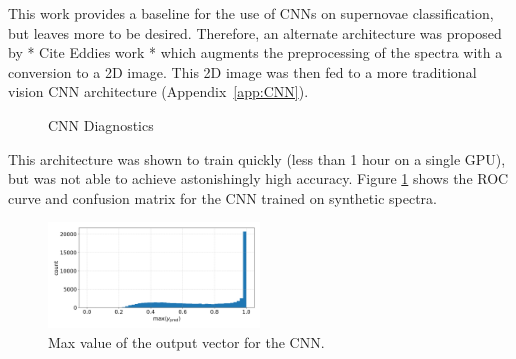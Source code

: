 This work provides a baseline for the use of CNNs on supernovae classification, 
but leaves more to be desired. Therefore, an alternate architecture was proposed 
by * Cite Eddies work * which augments the preprocessing of the spectra with 
a conversion to a 2D image. This 2D image was then fed to a more traditional vision 
CNN architecture (Appendix~\ref{app:CNN}). 
\begin{figure}[h]
    \centering
    \qquad
    \caption{CNN Diagnostics}
    \label{fig:cnn_qual}
\end{figure}
This architecture was shown to train quickly (less than 1 hour on a single GPU), 
but was not able to achieve astonishingly high accuracy. Figure \ref{fig:cnn_qual}
shows the ROC curve and confusion matrix for the CNN trained on synthetic spectra. 
\begin{figure}[h]
    \centering
    \includegraphics[width=0.5\textwidth]{figures/cnn_max_ypred.png}
    \caption{Max value of the output vector for the CNN.}
    \label{fig:cnn_max}
\end{figure}

